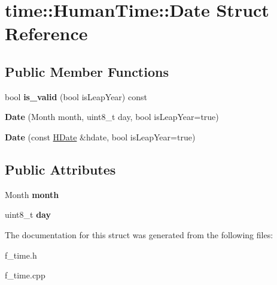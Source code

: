 \hypertarget{structtime_1_1_human_time_1_1_date}{}\section{time\+::Human\+Time\+::Date Struct Reference}
\label{structtime_1_1_human_time_1_1_date}
\subsection*{Public Member Functions}
\begin{DoxyCompactItemize}
\item 
\mbox{\label{structtime_1_1_human_time_1_1_date_a5b535bdd5929bfba17cc20a25b04dadc}} 
bool {\bfseries is\+\_\+valid} (bool is\+Leap\+Year) const
\item 
\mbox{\label{structtime_1_1_human_time_1_1_date_a2b525687bea7f35f4e4bafa363eea273}} 
{\bfseries Date} (Month month, uint8\+\_\+t day, bool is\+Leap\+Year=true)
\item 
\mbox{\label{structtime_1_1_human_time_1_1_date_ab0a7f301bfaa887eca33c2a0731a6878}} 
{\bfseries Date} (const \mbox{\hyperlink{structtime_1_1_human_time_1_1_h_date}{H\+Date}} \&hdate, bool is\+Leap\+Year=true)
\end{DoxyCompactItemize}
\subsection*{Public Attributes}
\begin{DoxyCompactItemize}
\item 
\mbox{\label{structtime_1_1_human_time_1_1_date_aa53d83a8e90f63d8ac12dd0c954cc2b5}} 
Month {\bfseries month}
\item 
\mbox{\label{structtime_1_1_human_time_1_1_date_aee573799a8147a4936a09682dc532b7c}} 
uint8\+\_\+t {\bfseries day}
\end{DoxyCompactItemize}


The documentation for this struct was generated from the following files\+:\begin{DoxyCompactItemize}
\item 
f\+\_\+time.\+h\item 
f\+\_\+time.\+cpp\end{DoxyCompactItemize}
